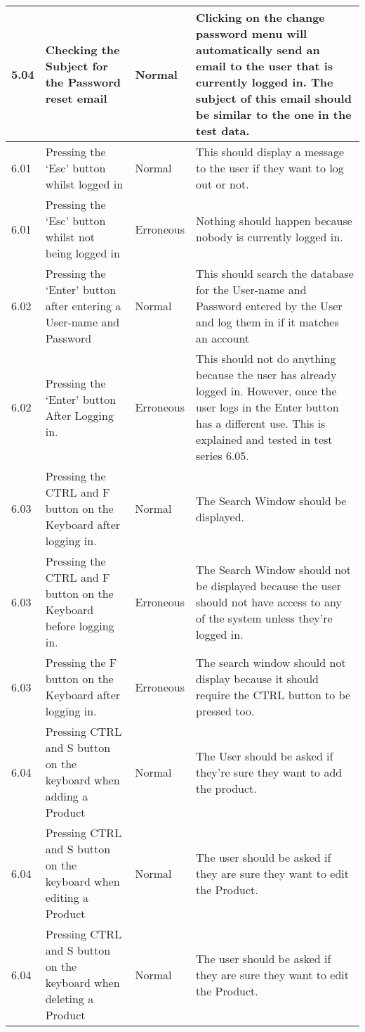\begin{flushleft}
\begin{longtable}{|p{1.5cm}|p{2.5cm}|p{2cm}|p{4.5cm}|}
	\rowcolor{light-grey}5.04 &Checking the Subject for the Password reset email & Normal & Clicking on the change password menu will automatically send an email to the user that is currently logged in. The subject of this email should be similar to the one in the test data.\\ \hline
	\rowcolor{light-grey}6.01 & Pressing the `Esc' button whilst logged in & Normal & This should display a message to the user if they want to log out or not.\\ \hline
	\rowcolor{light-grey}6.01 & Pressing the `Esc' button whilst not being logged in & Erroneous & Nothing should happen because nobody is currently logged in.\\ \hline
	\rowcolor{light-grey}6.02 & Pressing the `Enter' button after entering a User-name and Password & Normal & This should search the database for the User-name and Password entered by the User and log them in if it matches an account\\ \hline
	\rowcolor{light-grey}6.02 & Pressing the `Enter' button After Logging in. & Erroneous & This should not do anything because the user has already logged in. However, once the user logs in the Enter button has a different use. This is explained and tested in test series 6.05.\\ \hline
	\rowcolor{light-grey}6.03 & Pressing the CTRL and F button on the Keyboard after logging in. & Normal & The Search Window should be displayed.\\ \hline
	\rowcolor{light-grey}6.03 & Pressing the CTRL and F button on the Keyboard before logging in. & Erroneous & The Search Window should not be displayed because the user should not have access to any of the system unless they're logged in. \\ \hline
	\rowcolor{light-grey}6.03 & Pressing the F button on the Keyboard after logging in. & Erroneous &  The search window should not display because it should require the CTRL button to be pressed too. \\ \hline
	\rowcolor{light-grey}6.04 & Pressing CTRL and S button on the keyboard when adding a Product & Normal &  The User should be asked if they're sure they want to add the product. \\ \hline
	\rowcolor{light-grey}6.04 & Pressing CTRL and S button on the keyboard when editing a Product & Normal & The user should be asked if they are sure they want to edit the Product. \\ \hline
	\rowcolor{light-grey}6.04 & Pressing CTRL and S button on the keyboard when deleting a Product & Normal & The user should be asked if they are sure they want to edit the Product. \\ \hline

\end{longtable}
\end{flushleft}
